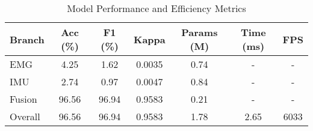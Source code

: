 \begin{table}[htbp]
\centering
\caption{Model Performance and Efficiency Metrics}
\begin{tabular}{lcccccc}
\hline
Branch & Acc (\%) & F1 (\%) & Kappa & Params (M) & Time (ms) & FPS \\
\hline
EMG    & 4.25 & 1.62 & 0.0035 & 0.74 & - & - \\
IMU    & 2.74 & 0.97 & 0.0047 & 0.84 & - & - \\
Fusion & 96.56 & 96.94 & 0.9583 & 0.21 & - & - \\
Overall & 96.56 & 96.94 & 0.9583 & 1.78 & 2.65 & 6033 \\
\hline
\end{tabular}
\end{table}
